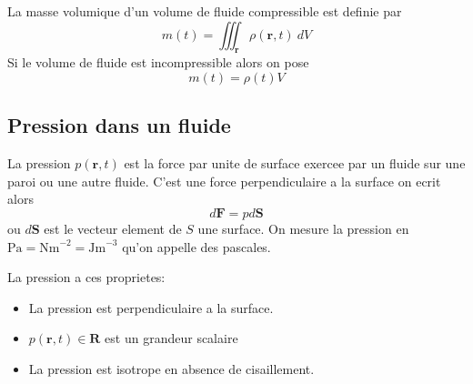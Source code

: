 \begin{definition} 
La masse volumique d'un volume de fluide compressible est definie par 
$$
m(t)=\iiint _{\boldsymbol{r}}\rho(\boldsymbol{r},t)~dV
$$
Si le volume de fluide est incompressible alors on pose
$$
m(t)=\rho(t)V
$$
\end{definition}

\subsection{Pression dans un fluide}
\begin{definition}
La pression $p(\boldsymbol{r},t)$ est la force par unite de surface exercee par un fluide sur une paroi ou une autre fluide. C'est une force perpendiculaire a la surface on ecrit alors
$$
d\boldsymbol{F}=pd\boldsymbol{S}
$$
ou $d\boldsymbol{S}$ est le vecteur element de $S$ une surface. On mesure la pression en $\mathrm{Pa}=\mathrm{Nm}^{-2}=\mathrm{Jm}^{-3}$ qu'on appelle des pascales.
\end{definition}
La pression a ces proprietes:
\begin{itemize}
\item La pression est perpendiculaire a la surface.
\item $p(\boldsymbol{r},t)\in \mathbf{R}$ est un grandeur scalaire 
\item La pression est isotrope en absence de cisaillement. 
\end{itemize}

